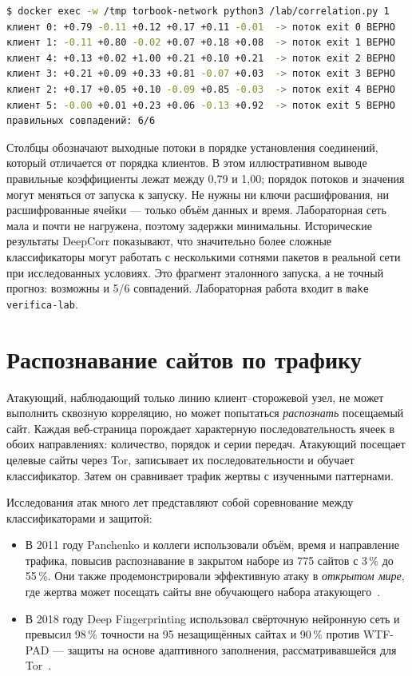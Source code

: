 \begin{lstlisting}[language=bash,numbers=none]
$ docker exec -w /tmp torbook-network python3 /lab/correlation.py 1
клиент 0: +0.79 -0.11 +0.12 +0.17 +0.11 -0.01  -> поток exit 0 ВЕРНО
клиент 1: -0.11 +0.80 -0.02 +0.07 +0.18 +0.08  -> поток exit 1 ВЕРНО
клиент 4: +0.13 +0.02 +1.00 +0.21 +0.10 +0.21  -> поток exit 2 ВЕРНО
клиент 3: +0.21 +0.09 +0.33 +0.81 -0.07 +0.03  -> поток exit 3 ВЕРНО
клиент 2: +0.17 +0.05 +0.10 -0.09 +0.85 -0.03  -> поток exit 4 ВЕРНО
клиент 5: -0.00 +0.01 +0.23 +0.06 -0.13 +0.92  -> поток exit 5 ВЕРНО
правильных совпадений: 6/6
\end{lstlisting}
Столбцы обозначают выходные потоки в порядке установления соединений, который отличается от порядка клиентов. В этом иллюстративном выводе правильные коэффициенты лежат между 0,79 и 1,00; порядок потоков и значения могут меняться от запуска к запуску. Не нужны ни ключи расшифрования, ни расшифрованные ячейки — только объём данных и время. Лабораторная сеть мала и почти не нагружена, поэтому задержки минимальны. Исторические результаты DeepCorr показывают, что значительно более сложные классификаторы могут работать с несколькими сотнями пакетов в реальной сети при исследованных условиях. Это фрагмент эталонного запуска, а не точный прогноз: возможны и 5/6 совпадений. Лабораторная работа входит в \texttt{make verifica-lab}.

\section{Распознавание сайтов по трафику}\label{sec:att-wf}

Атакующий, наблюдающий только линию клиент--сторожевой узел, не может выполнить сквозную корреляцию, но может попытаться \emph{распознать} посещаемый сайт. Каждая веб-страница порождает характерную последовательность ячеек в обоих направлениях: количество, порядок и серии передач. Атакующий посещает целевые сайты через Tor, записывает их последовательности и обучает классификатор. Затем он сравнивает трафик жертвы с изученными паттернами.

Исследования атак много лет представляют собой соревнование между классификаторами и защитой:
\begin{itemize}
  \item В 2011 году Panchenko и коллеги использовали объём, время и направление трафика, повысив распознавание в закрытом наборе из 775 сайтов с 3\,\% до 55\,\%. Они также продемонстрировали эффективную атаку в \emph{открытом мире}, где жертва может посещать сайты вне обучающего набора атакующего~\cite{panchenko2011website}.
  \item В 2018 году Deep Fingerprinting использовал свёрточную нейронную сеть и превысил 98\,\% точности на 95 незащищённых сайтах и 90\,\% против WTF-PAD — защиты на основе адаптивного заполнения, рассматривавшейся для Tor~\cite{sirinam2018deep}.
\end{itemize}

